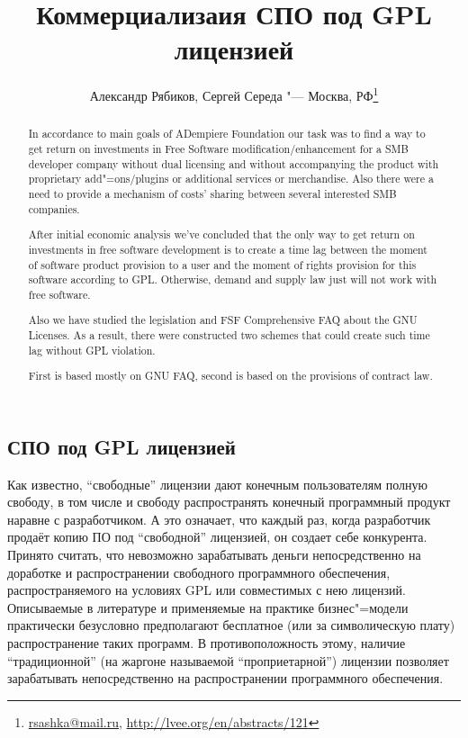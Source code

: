 \documentclass[10pt, a5paper]{article}
\begin{document}
\title{Коммерциализаия СПО под GPL лицензией}
\author{Александр Рябиков, Сергей Середа "--- Москва, РФ\footnote{\url{rsashka@mail.ru}, \url{http://lvee.org/en/abstracts/121}}}
\maketitle
\begin{abstract}
In accordance to main goals of ADempiere Foundation our task was to find a way to get return on investments in Free Software modification/enhancement for a SMB developer company without dual licensing and without accompanying the product with proprietary add"=ons/plugins or additional services or merchandise. Also there were a need to provide a mechanism of costs' sharing between several interested SMB companies.

After initial economic analysis we've concluded that the only way to get return on investments in free software development is to create a time lag between the moment of software product provision to a user and the moment of rights provision for this software according to GPL. Otherwise, demand and supply law just will not work with free software.

Also we have studied the legislation and FSF Comprehensive FAQ about the GNU Licenses. As a result, there were constructed two schemes that could create such time lag without GPL violation. 

First is based mostly on GNU FAQ, second is based on the provisions of contract law.
\end{abstract}


\subsection*{СПО под GPL лицензией}

Как известно, “свободные” лицензии дают конечным пользователям полную свободу, в том числе и свободу распространять конечный программный продукт наравне с разработчиком. А это означает, что каждый раз, когда разработчик продаёт копию ПО под “свободной” лицензией, он создает себе конкурента. Принято считать, что невозможно зарабатывать деньги непосредственно на доработке и распространении свободного программного обеспечения, распространяемого на условиях GPL или совместимых с нею лицензий. Описываемые в литературе и применяемые на практике бизнес"=модели практически безусловно предполагают бесплатное (или за символическую плату) распространение таких программ. В противоположность этому, наличие “традиционной” (на жаргоне называемой “проприетарной”) лицензии позволяет зарабатывать непосредственно на распространении программного обеспечения.
\end{document}
